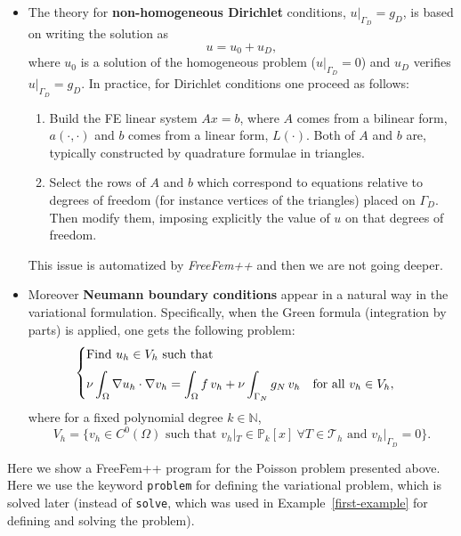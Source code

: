 \documentclass[12pt]{article}
\newcommand{\FF}{\textit{FreeFem++}\xspace}
\begin{document}
\begin{itemize}
\item The theory for \textbf{non-homogeneous Dirichlet} conditions,
  $u|_{\Gamma_D}=g_D$, is based on writing the solution as
  $$
  u = u_0 + u_D,
  $$
  where $u_0$ is a solution of the homogeneous problem
  ($u|_{\Gamma_D}=0$) and $u_D$ verifies $u|_{\Gamma_D}=g_D$.
  In practice, for Dirichlet conditions one proceed as follows:
  \begin{enumerate}
  \item Build the FE linear system $Ax=b$, where $A$ comes from a
    bilinear form, $a(\cdot,\cdot)$ and $b$ comes from a linear form,
    $L(\cdot)$. Both of $A$ and $b$ are, typically constructed by
    quadrature formulae in triangles.
  \item Select the rows of $A$ and $b$ which correspond to equations
    relative to degrees of freedom (for instance vertices of the
    triangles) placed on $\Gamma_D$. Then modify them, imposing
    explicitly the value of $u$ on that degrees of freedom.
  \end{enumerate}
  This issue is automatized by \FF and then we are not going
  deeper.

\item Moreover \textbf{Neumann boundary conditions} appear in a natural way in the
  variational formulation. Specifically, when the Green formula
  (integration by parts) is applied, one gets the following problem:
  \begin{equation*}
      \begin{cases}
      \text{Find $u_h\in V_{h}$ such that}
      \\\noalign{\medskip}
      \begin{aligned}
        \nu\int_\Omega \nabla u_h \cdot \nabla v_h = \int_\Omega f\, v_h
        + \nu\int_{\Gamma_N} g_N\, v_h
        \quad\text{for all } v_h\in V_{h},
      \end{aligned}
    \end{cases}
  \end{equation*}
  where for a fixed polynomial degree $k\in\mathbb{N}$,
  $$V_h=\big\{v_h\in C^0(\Omega) \text{ such that }
  v_h|_T \in \mathbb{P}_k[x] \ \forall T\in \mathcal{T}_h \text{ and } v_h|_{\Gamma_D}=0\big\}.
  $$
  \end{itemize}

  Here we show a FreeFem++ program for the Poisson problem presented
  above.  Here we use the keyword \texttt{problem} for defining the
  variational problem, which is solved later (instead of
  \texttt{solve}, which was used in Example~\ref{first-example} for
  defining and solving the problem).
\end{document}
